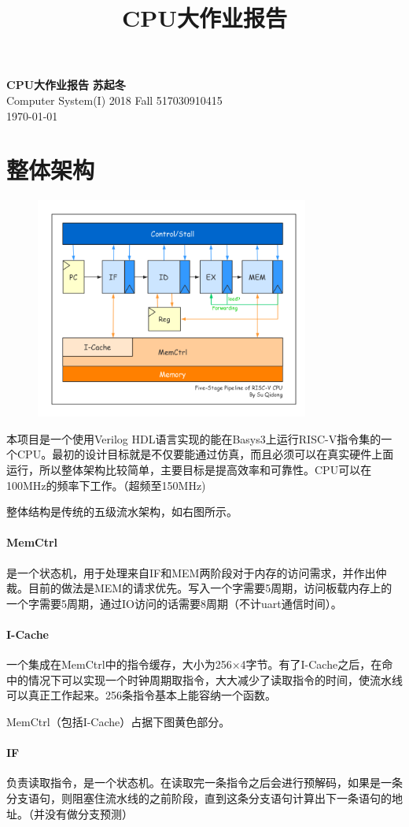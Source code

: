 \documentclass[UTF8]{ctexart}
\title{CPU大作业报告}
\begin{document}
\noindent
\large\textbf{CPU大作业报告} \hfill \textbf{苏起冬} \\
\normalsize Computer System(I) 2018 Fall \hfill 517030910415 \\
\today
	
\section{整体架构}
	\begin{figure}
	\includegraphics[width=9cm]{arch.png}
	\end{figure}

	本项目是一个使用Verilog HDL语言实现的能在Basys3上运行RISC-V指令集的一个CPU。最初的设计目标就是不仅要能通过仿真，而且必须可以在真实硬件上面运行，所以整体架构比较简单，主要目标是提高效率和可靠性。CPU可以在100MHz的频率下工作。（超频至150MHz)
	
	整体结构是传统的五级流水架构，如右图所示。
	
	\paragraph{MemCtrl} 是一个状态机，用于处理来自IF和MEM两阶段对于内存的访问需求，并作出仲裁。目前的做法是MEM的请求优先。写入一个字需要5周期，访问板载内存上的一个字需要5周期，通过IO访问的话需要8周期（不计uart通信时间）。
	\paragraph{I-Cache} 一个集成在MemCtrl中的指令缓存，大小为256×4字节。有了I-Cache之后，在命中的情况下可以实现一个时钟周期取指令，大大减少了读取指令的时间，使流水线可以真正工作起来。256条指令基本上能容纳一个函数。
	
	MemCtrl（包括I-Cache）占据下图黄色部分。
	
	\paragraph{IF} 负责读取指令，是一个状态机。在读取完一条指令之后会进行预解码，如果是一条分支语句，则阻塞住流水线的之前阶段，直到这条分支语句计算出下一条语句的地址。（并没有做分支预测）
	
\end{document}
